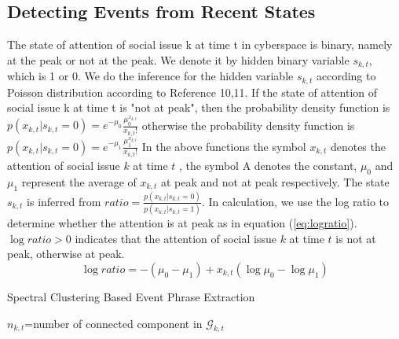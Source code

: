 \documentclass[conference,compsoc]{IEEEtran}
\begin{document}
\subsection{Detecting Events from Recent States}
\label{subsec:detection}
The state of attention of social issue k at time t in cyberspace is binary, namely at the peak or not at the peak. We denote it by hidden binary variable \(s_{k,t}\), which is 1 or 0. We do the inference for the hidden variable \(s_{k,t}\) according to Poisson distribution according to Reference\cite{Diao:2012wj} 10,11. If the state of attention of social issue k at time t is "not at peak", then the probability density function is 
\(p(x_{k,t}|s_{k,t}=0)=e^{-\mu_0 }  \frac{\mu_0^{x_{k,t}}}{x_{k,t}!}\) otherwise the probability density function is \(p(x_{k,t}|s_{k,t}=0)=e^{-\mu_1 }  \frac{\mu_1^{x_{k,t}}}{x_{k,t}!}\)
In the above functions the symbol \(x_{k,t}\) denotes the attention of social issue \(k\) at time \(t\) , the symbol A denotes the constant, \(\mu_0\) and \(\mu_1\) represent the average of \(x_{k,t}\) at peak and not at peak respectively. The state \(s_{k,t}\) is inferred from \(ratio=\frac{p(x_{k,t} |s_{k,t}=0)}{p(x_{k,t} |s_{k,t}=1)} \).
In calculation, we use the log ratio to determine whether the attention is at peak as in equation (\ref{eq:logratio}). \(\log ratio>0 \) indicates that the attention of social issue \(k\) at time \(t\) is not at peak, otherwise at peak. 
\begin{equation}
\label{eq:logratio}
\log ratio=-(\mu_0-\mu_1 )+x_{k,t}(\log \mu_0 -\log⁡ \mu_1)
\end{equation}

\begin{algorithm}
\scriptsize
\label{alg:eventKeywordsSearchMethod}
\caption{Spectral Clustering Based Event Phrase Extraction}
\label{alg:eventKeywordsSearchMethod}
\(n_{k,t}\)=number of connected component in \(\mathcal{G}_{k,t}\)\\
\end{algorithm}
\end{document}
